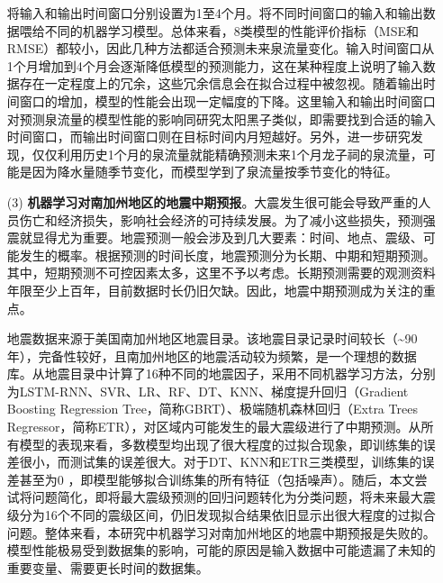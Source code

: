 \begin{enumerate}
  将输入和输出时间窗口分别设置为1至4个月。将不同时间窗口的输入和输出数据喂给不同的机器学习模型。总体来看，8类模型的性能评价指标（MSE和RMSE）都较小，因此几种方法都适合预测未来泉流量变化。输入时间窗口从1个月增加到4个月会逐渐降低模型的预测能力，这在某种程度上说明了输入数据存在一定程度上的冗余，这些冗余信息会在拟合过程中被忽视。随着输出时间窗口的增加，模型的性能会出现一定幅度的下降。这里输入和输出时间窗口对预测泉流量的模型性能的影响同研究太阳黑子类似，即需要找到合适的输入时间窗口，而输出时间窗口则在目标时间内月短越好。另外，进一步研究发现，仅仅利用历史1个月的泉流量就能精确预测未来1个月龙子祠的泉流量，可能是因为降水量随季节变化，而模型学到了泉流量按季节变化的特征。
  
  \item[(3)] \textbf{机器学习对南加州地区的地震中期预报}。大震发生很可能会导致严重的人员伤亡和经济损失，影响社会经济的可持续发展。为了减小这些损失，预测强震就显得尤为重要。地震预测一般会涉及到几大要素：时间、地点、震级、可能发生的概率。根据预测的时间长度，地震预测分为长期、中期和短期预测。其中，短期预测不可控因素太多，这里不予以考虑。长期预测需要的观测资料年限至少上百年，目前数据时长仍旧欠缺。因此，地震中期预测成为关注的重点。
  
  地震数据来源于美国南加州地区地震目录。该地震目录记录时间较长（\sim 90年），完备性较好，且南加州地区的地震活动较为频繁，是一个理想的数据库。从地震目录中计算了16种不同的地震因子，采用不同机器学习方法，分别为LSTM-RNN、SVR、LR、RF、DT、KNN、梯度提升回归（Gradient Boosting Regression Tree，简称GBRT）、极端随机森林回归（Extra Trees Regressor，简称ETR），对区域内可能发生的最大震级进行了中期预测。从所有模型的表现来看，多数模型均出现了很大程度的过拟合现象，即训练集的误差很小，而测试集的误差很大。对于DT、KNN和ETR三类模型，训练集的误差甚至为0 ，即模型能够拟合训练集的所有特征（包括噪声）。随后，本文尝试将问题简化，即将最大震级预测的回归问题转化为分类问题，将未来最大震级分为16个不同的震级区间，仍旧发现拟合结果依旧显示出很大程度的过拟合问题。整体来看，本研究中机器学习对南加州地区的地震中期预报是失败的。模型性能极易受到数据集的影响，可能的原因是输入数据中可能遗漏了未知的重要变量、需要更长时间的数据集。

\end{enumerate}


